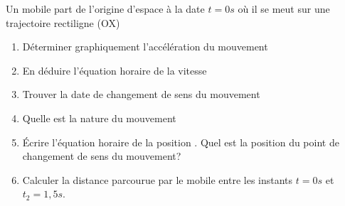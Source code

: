 \documentclass[10pt,a4paper]{article}
\begin{document}
\begin{tcolorbox}[sabour,title=EXERCICE 3]
\begin{minipage}{9cm}
Un mobile part de l'origine d'espace à la date $t=0 s$ où il se meut sur une trajectoire rectiligne (OX)

\begin{enumerate}
\item Déterminer graphiquement l'accélération du mouvement
\item En déduire  l'équation horaire de la vitesse 
\item Trouver la date de changement de sens du mouvement 
\item Quelle est la nature du mouvement
\item Écrire l'équation horaire de la position . Quel est la position du point de changement de sens du mouvement?
\item Calculer la distance parcourue par le mobile entre les instants $t=0s $ et $t_2=1,5s$.
\end{enumerate}
\end{minipage}
\begin{minipage}{8cm}


\end{minipage}
\end{tcolorbox}
\end{document}
